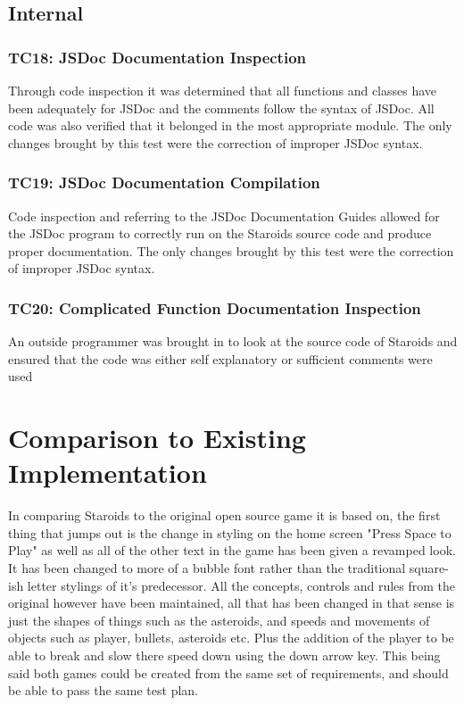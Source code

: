 \documentclass[12pt, titlepage]{article}
\begin{document}
\subsection{Internal}

\subsubsection{TC18: JSDoc Documentation Inspection}
Through code inspection it was determined that all functions and classes have been adequately for JSDoc and the comments follow the syntax of JSDoc. All code was also verified that it belonged in the most appropriate module. The only changes brought by this test were the correction of improper JSDoc syntax.
\subsubsection{TC19: JSDoc Documentation Compilation}
Code inspection and referring to the JSDoc Documentation Guides allowed for the JSDoc program to correctly run on the Staroids source code and produce proper documentation. The only changes brought by this test were the correction of improper JSDoc syntax.
\subsubsection{TC20: Complicated Function Documentation Inspection}
An outside programmer was brought in to look at the source code of Staroids and ensured that the code was either self explanatory or sufficient comments were used

\section{Comparison to Existing Implementation}

In comparing Staroids to the original open source game it is based on, the first thing that jumps out is the change in styling on the home screen "Press Space to Play" as well as all of the other text in the game has been given a revamped look. It has been changed to more of a bubble font rather than the traditional square-ish letter stylings of it's predecessor. All the concepts, controls and rules from the original however have been maintained, all that has been changed in that sense is just the shapes of things such as the asteroids, and speeds and movements of objects such as player, bullets, asteroids etc. Plus the addition of the player to be able to break and slow there speed down using the down arrow key. This being said both games could be created from the same set of requirements, and should be able to pass the same test plan.
\end{document}
